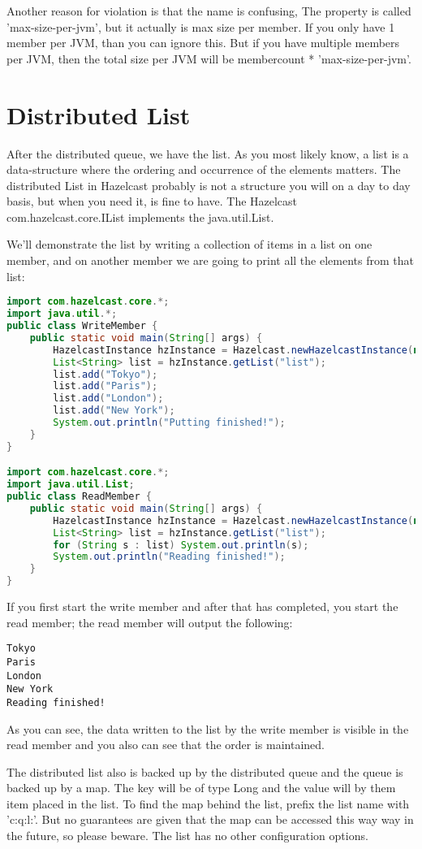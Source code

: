 Another reason for violation is that the name is confusing, The property is called 'max-size-per-jvm', but it actually is max size per member. If you only have 1 member per JVM, than you can ignore this. But if you have multiple members per JVM, then the total size per JVM will be membercount * 'max-size-per-jvm'.

\section{Distributed List}
After the distributed queue, we have the list. As you most likely know, a list is a data-structure where the ordering and occurrence of the elements matters. The distributed List in Hazelcast probably is not a structure you will on a day to day basis, but when you need it, is fine to have. The Hazelcast com.hazelcast.core.IList implements the java.util.List.

We'll demonstrate the list by writing a collection of items in a list on one member, and on another member we are going to print all the elements from that list:
\begin{lstlisting}[language=java]
import com.hazelcast.core.*;
import java.util.*;
public class WriteMember {
    public static void main(String[] args) {
        HazelcastInstance hzInstance = Hazelcast.newHazelcastInstance(null);
        List<String> list = hzInstance.getList("list");
        list.add("Tokyo");
        list.add("Paris");
        list.add("London");
        list.add("New York");
        System.out.println("Putting finished!");
    }
}

import com.hazelcast.core.*;
import java.util.List;
public class ReadMember {
    public static void main(String[] args) {
        HazelcastInstance hzInstance = Hazelcast.newHazelcastInstance(null);
        List<String> list = hzInstance.getList("list");
        for (String s : list) System.out.println(s);
        System.out.println("Reading finished!");
    }
}
\end{lstlisting}
If you first start the write member and after that has completed, you start the read member; the read member will output the following:
\begin{lstlisting}
Tokyo
Paris
London
New York
Reading finished!
\end{lstlisting}
As you can see, the data written to the list by the write member is visible in the read member and you also can see that the order is maintained.

The distributed list also is backed up by the distributed queue and the queue is backed up by a map. The key will be of type Long and the value will by them item placed in the list. To find the map behind the list, prefix the list name with 'c:q:l:'. But no guarantees are given that the map can be accessed this way way in the future, so please beware. The list has no other configuration options.


